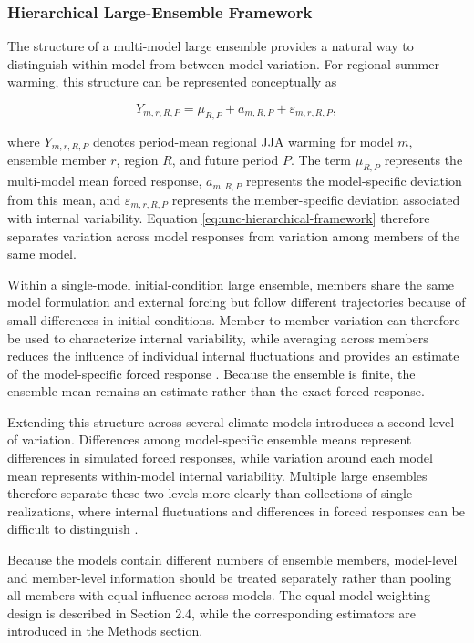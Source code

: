 \documentclass[
]{krantz}
\begin{document}
\subsubsection{Hierarchical Large-Ensemble Framework}\label{hierarchical-large-ensemble-framework}

The structure of a multi-model large ensemble provides a natural way to distinguish within-model from between-model variation. For regional summer warming, this structure can be represented conceptually as

\begin{equation}
Y_{m,r,R,P}
=
\mu_{R,P}
+
a_{m,R,P}
+
\varepsilon_{m,r,R,P},
\label{eq:unc-hierarchical-framework}
\end{equation}

where \(Y_{m,r,R,P}\) denotes period-mean regional JJA warming for model \(m\), ensemble member \(r\), region \(R\), and future period \(P\). The term \(\mu_{R,P}\) represents the multi-model mean forced response, \(a_{m,R,P}\) represents the model-specific deviation from this mean, and \(\varepsilon_{m,r,R,P}\) represents the member-specific deviation associated with internal variability. Equation \eqref{eq:unc-hierarchical-framework} therefore separates variation across model responses from variation among members of the same model.

Within a single-model initial-condition large ensemble, members share the same model formulation and external forcing but follow different trajectories because of small differences in initial conditions. Member-to-member variation can therefore be used to characterize internal variability, while averaging across members reduces the influence of individual internal fluctuations and provides an estimate of the model-specific forced response \citep{Gruber2026, Deser2020}. Because the ensemble is finite, the ensemble mean remains an estimate rather than the exact forced response.

Extending this structure across several climate models introduces a second level of variation. Differences among model-specific ensemble means represent differences in simulated forced responses, while variation around each model mean represents within-model internal variability. Multiple large ensembles therefore separate these two levels more clearly than collections of single realizations, where internal fluctuations and differences in forced responses can be difficult to distinguish \citep{Lehner2020}.

Because the models contain different numbers of ensemble members, model-level and member-level information should be treated separately rather than pooling all members with equal influence across models. The equal-model weighting design is described in Section 2.4, while the corresponding estimators are introduced in the Methods section.
\end{document}
